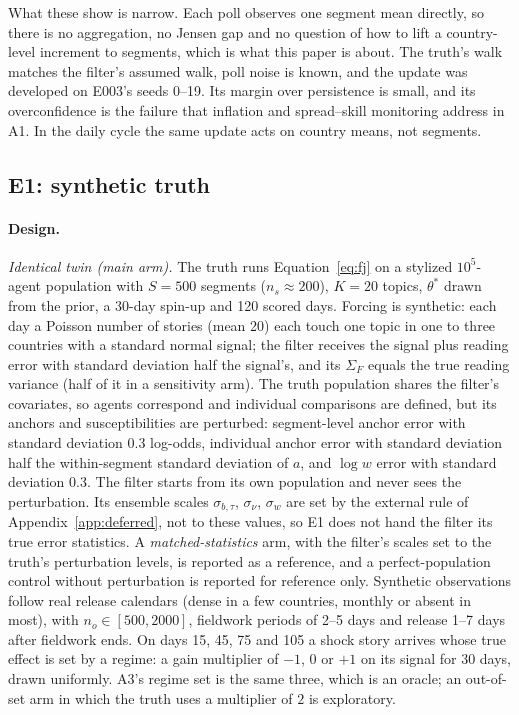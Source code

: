\documentclass[10pt]{article}
\theoremstyle{remark}
\begin{document}
What these show is narrow. Each poll observes one segment mean directly, so there is no aggregation, no Jensen gap and no question of how to lift a country-level increment to segments, which is what this paper is about. The truth's walk matches the filter's assumed walk, poll noise is known, and the update was developed on E003's seeds 0--19. Its margin over persistence is small, and its overconfidence is the failure that inflation and spread--skill monitoring address in A1. In the daily cycle the same update acts on country means, not segments.

\subsection{E1: synthetic truth}
\label{sec:e1}
\paragraph{Design.} \emph{Identical twin (main arm).} The truth runs Equation~\eqref{eq:fj} on a stylized $10^5$-agent population with $S=500$ segments ($n_s\approx200$), $K=20$ topics, $\theta^\ast$ drawn from the prior, a 30-day spin-up and 120 scored days. Forcing is synthetic: each day a Poisson number of stories (mean 20) each touch one topic in one to three countries with a standard normal signal; the filter receives the signal plus reading error with standard deviation half the signal's, and its $\Sigma_F$ equals the true reading variance (half of it in a sensitivity arm). The truth population shares the filter's covariates, so agents correspond and individual comparisons are defined, but its anchors and susceptibilities are perturbed: segment-level anchor error with standard deviation $0.3$ log-odds, individual anchor error with standard deviation half the within-segment standard deviation of $a$, and $\log w$ error with standard deviation $0.3$. The filter starts from its own population and never sees the perturbation. Its ensemble scales $\sigma_{b,\tau}$, $\sigma_\nu$, $\sigma_w$ are set by the external rule of Appendix~\ref{app:deferred}, not to these values, so E1 does not hand the filter its true error statistics. A \emph{matched-statistics} arm, with the filter's scales set to the truth's perturbation levels, is reported as a reference, and a perfect-population control without perturbation is reported for reference only. Synthetic observations follow real release calendars (dense in a few countries, monthly or absent in most), with $n_o\in[500,2000]$, fieldwork periods of 2--5 days and release 1--7 days after fieldwork ends. On days 15, 45, 75 and 105 a shock story arrives whose true effect is set by a regime: a gain multiplier of $-1$, $0$ or $+1$ on its signal for 30 days, drawn uniformly. A3's regime set is the same three, which is an oracle; an out-of-set arm in which the truth uses a multiplier of $2$ is exploratory.
\end{document}
